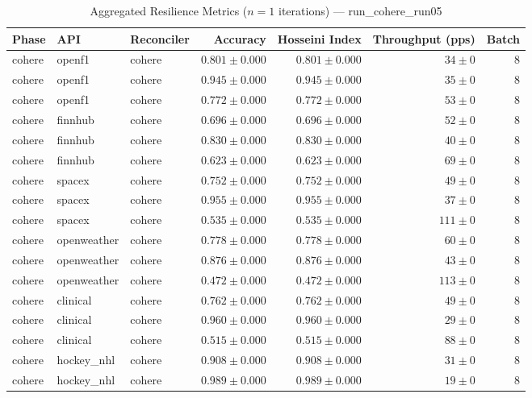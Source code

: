 
\begin{table}[htbp]
\caption{Aggregated Resilience Metrics ($n=1$ iterations) --- run_cohere_run05}
\begin{tabular}{l l l r r r r}
\hline
Phase & API & Reconciler & Accuracy & Hosseini Index & Throughput (pps) & Batch \\
\hline
cohere & openf1 & cohere & $0.801\pm0.000$ & $0.801\pm0.000$ & $34\pm0$ & 8 \\
cohere & openf1 & cohere & $0.945\pm0.000$ & $0.945\pm0.000$ & $35\pm0$ & 8 \\
cohere & openf1 & cohere & $0.772\pm0.000$ & $0.772\pm0.000$ & $53\pm0$ & 8 \\
cohere & finnhub & cohere & $0.696\pm0.000$ & $0.696\pm0.000$ & $52\pm0$ & 8 \\
cohere & finnhub & cohere & $0.830\pm0.000$ & $0.830\pm0.000$ & $40\pm0$ & 8 \\
cohere & finnhub & cohere & $0.623\pm0.000$ & $0.623\pm0.000$ & $69\pm0$ & 8 \\
cohere & spacex & cohere & $0.752\pm0.000$ & $0.752\pm0.000$ & $49\pm0$ & 8 \\
cohere & spacex & cohere & $0.955\pm0.000$ & $0.955\pm0.000$ & $37\pm0$ & 8 \\
cohere & spacex & cohere & $0.535\pm0.000$ & $0.535\pm0.000$ & $111\pm0$ & 8 \\
cohere & openweather & cohere & $0.778\pm0.000$ & $0.778\pm0.000$ & $60\pm0$ & 8 \\
cohere & openweather & cohere & $0.876\pm0.000$ & $0.876\pm0.000$ & $43\pm0$ & 8 \\
cohere & openweather & cohere & $0.472\pm0.000$ & $0.472\pm0.000$ & $113\pm0$ & 8 \\
cohere & clinical & cohere & $0.762\pm0.000$ & $0.762\pm0.000$ & $49\pm0$ & 8 \\
cohere & clinical & cohere & $0.960\pm0.000$ & $0.960\pm0.000$ & $29\pm0$ & 8 \\
cohere & clinical & cohere & $0.515\pm0.000$ & $0.515\pm0.000$ & $88\pm0$ & 8 \\
cohere & hockey\_nhl & cohere & $0.908\pm0.000$ & $0.908\pm0.000$ & $31\pm0$ & 8 \\
cohere & hockey\_nhl & cohere & $0.989\pm0.000$ & $0.989\pm0.000$ & $19\pm0$ & 8 \\

\end{tabular}
\end{table}

